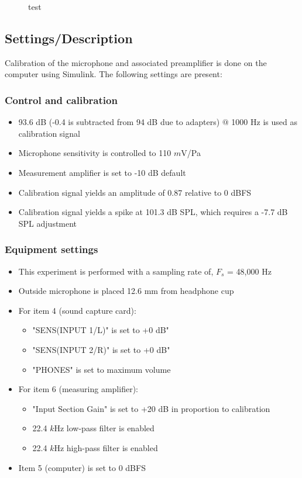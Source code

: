 \begin{figure}[H]
	\centering
	
	\caption{test}
	\label{test}
\end{figure}

\subsection{Settings/Description}
\label{SettingsHeadPhones}
Calibration of the microphone and associated preamplifier is done on the computer using Simulink\textsuperscript{\textregistered}. The following settings are present:

\subsubsection{Control and calibration}
\begin{itemize}

	\item 93.6 dB (-0.4 is subtracted from 94 dB due to adapters) $@$ 1000 Hz is used as calibration signal
	\item Microphone sensitivity is controlled to 110 $m$V/Pa
	\item Measurement amplifier is set to -10 dB default
	\item Calibration signal yields an amplitude of 0.87 relative to 0 dBFS
	\item  Calibration signal yields a spike at 101.3 dB SPL, which requires a -7.7 dB SPL adjustment
\end{itemize}
\subsubsection{Equipment settings}
\begin{itemize}
	\item This experiment is performed with a sampling rate of, $F_{s}$ = 48,000 Hz
	\item Outside microphone is placed 12.6 mm from headphone cup
	\item For item 4 (sound capture card):
	\begin{itemize}
		\item "SENS(INPUT 1/L)" is set to +0 dB"
		\item "SENS(INPUT 2/R)" is set to +0 dB"
		\item "PHONES" is set to maximum volume
	\end{itemize}		
	\item For item 6 (measuring amplifier):
		\begin{itemize}
			\item "Input Section Gain" is set to +20 dB in proportion to calibration
			\item 22.4 $k$Hz low-pass filter is enabled
			\item 22.4 $k$Hz high-pass filter is enabled 
		\end{itemize}
	\item Item 5 (computer) is set to 0 dBFS
\end{itemize}



